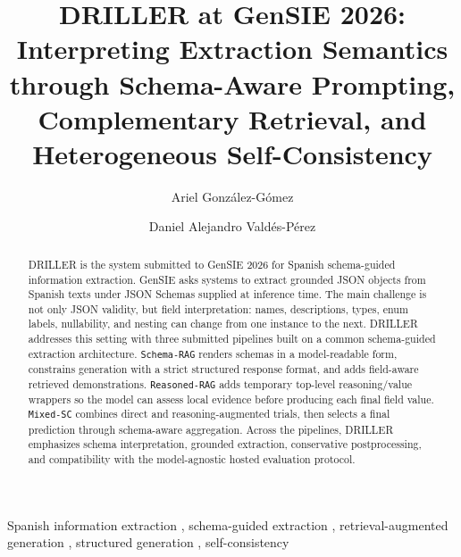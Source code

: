 \documentclass{CEURART/ceurart}
\begin{document}


\title{DRILLER at GenSIE 2026: Interpreting Extraction Semantics through Schema-Aware Prompting, Complementary Retrieval, and Heterogeneous Self-Consistency}

\author[1]{Ariel González-Gómez}
\author[1]{Daniel Alejandro Valdés-Pérez}
\address[1]{University of Havana, Havana, Cuba}

\begin{abstract}
DRILLER is the system submitted to GenSIE 2026 for Spanish schema-guided information extraction. GenSIE asks systems to extract grounded JSON objects from Spanish texts under JSON Schemas supplied at inference time. The main challenge is not only JSON validity, but field interpretation: names, descriptions, types, enum labels, nullability, and nesting can change from one instance to the next. DRILLER addresses this setting with three submitted pipelines built on a common schema-guided extraction architecture. \texttt{Schema-RAG} renders schemas in a model-readable form, constrains generation with a strict structured response format, and adds field-aware retrieved demonstrations. \texttt{Reasoned-RAG} adds temporary top-level reasoning/value wrappers so the model can assess local evidence before producing each final field value. \texttt{Mixed-SC} combines direct and reasoning-augmented trials, then selects a final prediction through schema-aware aggregation. Across the pipelines, DRILLER emphasizes schema interpretation, grounded extraction, conservative postprocessing, and compatibility with the model-agnostic hosted evaluation protocol.
\end{abstract}

\begin{keywords}
Spanish information extraction \sep
schema-guided extraction \sep
retrieval-augmented generation \sep
structured generation \sep
self-consistency
\end{keywords}

\maketitle











\appendix



\end{document}
